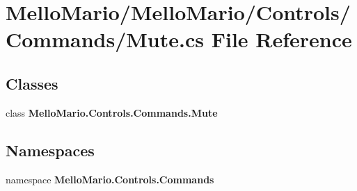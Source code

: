 \section{Mello\+Mario/\+Mello\+Mario/\+Controls/\+Commands/\+Mute.cs File Reference}
\label{Mute_8cs}
\subsection*{Classes}
\begin{DoxyCompactItemize}
\item 
class \textbf{ Mello\+Mario.\+Controls.\+Commands.\+Mute}
\end{DoxyCompactItemize}
\subsection*{Namespaces}
\begin{DoxyCompactItemize}
\item 
namespace \textbf{ Mello\+Mario.\+Controls.\+Commands}
\end{DoxyCompactItemize}
